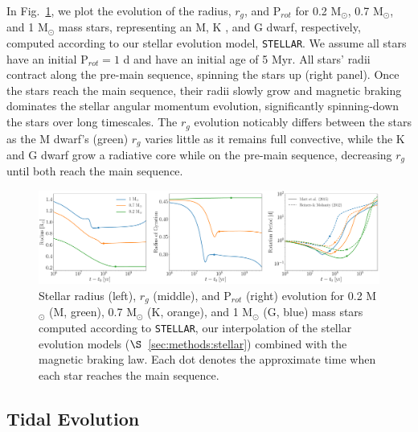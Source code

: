 \documentclass[twocolumn]{aastex61}
\newcommand{\stellar}[0]{\texttt{STELLAR}\xspace}
\begin{document}
In Fig.~\ref{fig:stellarExample}, we plot the evolution of the radius, $r_g$, and P$_{rot}$ for 0.2 M$_{\odot}$, 0.7 M$_{\odot}$, and 1 M$_{\odot}$ mass stars, representing an M, K , and G dwarf, respectively, computed according to our stellar evolution model, \stellar. We assume all stars have an initial P$_{rot} = 1$ d and have an initial age of 5 Myr. All stars' radii contract along the pre-main sequence, spinning the stars up (right panel). Once the stars reach the main sequence, their radii slowly grow and magnetic braking dominates the stellar angular momentum evolution, significantly spinning-down the stars over long timescales. The $r_g$ evolution noticably differs between the stars as the M dwarf's (green) $r_g$ varies little as it remains full convective, while the K and G dwarf grow a radiative core while on the pre-main sequence, decreasing $r_g$ until both reach the main sequence.

\begin{figure}[ht]
	\includegraphics[width=\textwidth]{../Plots/stellarExample.pdf}
   \caption{Stellar radius (left), $r_g$ (middle), and P$_{rot}$ (right) evolution for 0.2 M$_{\odot}$ (M, green), 0.7 M$_{\odot}$ (K, orange), and 1 M$_{\odot}$ (G, blue) mass stars computed according to \stellar, our interpolation of the \citet{Baraffe2015} stellar evolution models ($\S$~\ref{sec:methods:stellar}) combined with the \citet{Matt2015} magnetic braking law. Each dot denotes the approximate time when each star reaches the main sequence.}%
    \label{fig:stellarExample}%
\end{figure}

\subsection{Tidal Evolution} \label{sec:methods:eqtide}
\end{document}
